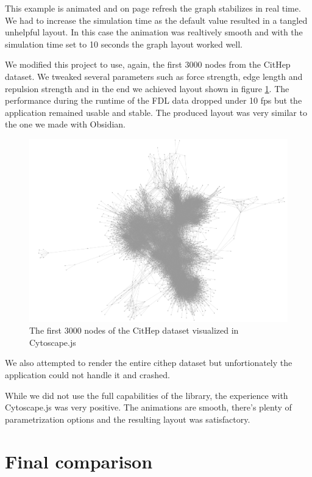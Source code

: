 This example is animated and on page refresh the graph stabilizes in real time.
We had to increase the simulation time as the default value resulted in a tangled unhelpful layout.
In this case the animation was realtively smooth and with the simulation time set to 10 seconds the graph layout worked well.

We modified this project to use, again, the first 3000 nodes from the CitHep dataset.
We tweaked several parameters such as force strength, edge length and repulsion strength and in the end we achieved layout shown in figure \ref{obr:cytoscape_3000_nodes}.
The performance during the runtime of the \gls{FDL} data dropped under 10 \gls{fps} but the application remained usable and stable.
The produced layout was very similar to the one we made with Obsidian.

\begin{figure}[p]\centering
  \includegraphics[width=140mm, keepaspectratio]{img/cytoscapejs_cithep_first_3000_nodes.png}
  \caption{The first 3000 nodes of the CitHep dataset visualized in Cytoscape.js}
  \label{obr:cytoscape_3000_nodes}
\end{figure}
We also attempted to render the entire cithep dataset but unfortionately the application could not handle it and crashed.

While we did not use the full capabilities of the library, the experience with Cytoscape.js was very positive.
The animations are smooth, there's plenty of parametrization options and the resulting layout was satisfactory.

\section{Final comparison}

